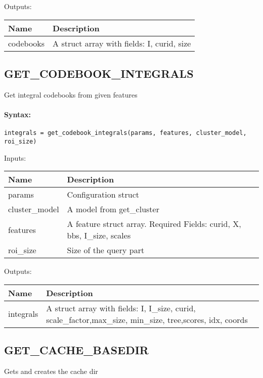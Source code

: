 \bigskip
Outputs:

\begin{tabular}{|p{}|p{}|}
\hline
\textbf{Name} & \textbf{Description} \\
\hline \hline
codebooks & A struct array with fields: I, curid, size  \\ \hline
\end{tabular}

\subsection{GET\_CODEBOOK\_INTEGRALS}

Get integral codebooks from given features

\paragraph{Syntax:} \verb|integrals = get_codebook_integrals(params, features, cluster_model, roi_size)|

\bigskip
Inputs:

\begin{tabular}{|p{}|p{}|}
\hline
\textbf{Name} & \textbf{Description} \\
\hline \hline
params & Configuration struct  \\ \hline
cluster\_model & A model from get\_cluster  \\ \hline
features & A feature struct array. Required Fields: curid, X, bbs, I\_size, scales  \\ \hline
roi\_size & Size of the query part  \\ \hline
\end{tabular}

\bigskip
Outputs:

\begin{tabular}{|p{}|p{}|}
\hline
\textbf{Name} & \textbf{Description} \\
\hline \hline
integrals & A struct array with fields: I, I\_size, curid, scale\_factor,max\_size, min\_size, tree,scores, idx, coords  \\ \hline
\end{tabular}

\subsection{GET\_CACHE\_BASEDIR}

Gets and creates the cache dir

